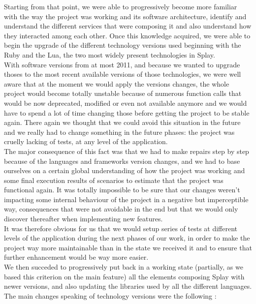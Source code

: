 \documentclass{eplmastersthesis}
\begin{document}
        Starting from that point, we were able to progressively become more
        familiar with the way the project was working and its software
        architecture, identify and understand the different services that
        were composing it and also understand how they interacted among
        each other. Once this knowledge acquired, we were able to begin the
        upgrade of the different technology versions used beginning with the
        Ruby and the Lua, the two most widely present technologies in Splay.\\
        With software versions from at most 2011, and because we wanted
        to upgrade thoses to the most recent available versions of those
        technologies, we were well aware that at the moment we would apply the
        versions changes, the whole project would become totally unstable
        because of numerous function calls that would be now deprecated,
        modified or even not available anymore and we would have to spend a lot
        of time changing those before getting the project to be stable again.
        There again we thought that we could avoid this situation in the future
        and we really had to change something in the future phases: the project
        was cruelly lacking of tests, at any level of the application.\\


        The major consequence of this fact was that we had to make repairs
        step by step because of the languages and frameworks version changes,
        and we had to base ourselves on a certain global understanding of how
        the project was working and some final execution results of scenarios
        to estimate that the project was functional again. It was totally
        impossible to be sure that our changes weren't impacting some internal
        behaviour of the project in a negative but imperceptible way,
        consequences that were not avoidable in the end but that we would
        only discover thereafter when implementing new features.\\
        It was therefore obvious for us that we would setup series of tests
        at different levels of the application during the next phases of our
        work, in order to make the project way more maintainable than in the
        state we received it and to ensure that further enhancement would
        be way more easier.\\


        We then succeded to progressively put back in a working state
        (partially, as we based this criterion on the main feature) all the
        elements composing Splay with newer versions, and also updating the
        libraries used by all the different languages. The main changes
        speaking of technology versions were the following :
\end{document}
